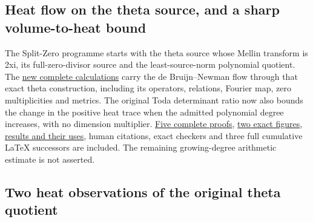 \documentclass[
]{article}
\begin{document}
\subsection{Heat flow on the theta source, and a sharp volume-to-heat
bound}\label{heat-flow-on-the-theta-source-and-a-sharp-volume-to-heat-bound}

The Split-Zero programme starts with the theta source whose Mellin
transform is 2xi, its full-zero-divisor source and the least-source-norm
polynomial quotient. The
\href{https://github.com/KokunoYumeto/zeta-function-research-reader/blob/main/workbenches/splitzero-tandem/continuations/20260920-heat-transport-arithmetic-volume/README.md}{new
complete calculations} carry the de Bruijn--Newman flow through that
exact theta construction, including its operators, relations, Fourier
map, zero multiplicities and metrics. The original Toda determinant
ratio now also bounds the change in the positive heat trace when the
admitted polynomial degree increases, with no dimension multiplier.
\href{https://github.com/KokunoYumeto/zeta-function-research-reader/blob/main/workbenches/splitzero-tandem/continuations/20260920-heat-transport-arithmetic-volume/COMPLETE_PROOFS.tex}{Five
complete proofs},
\href{https://github.com/KokunoYumeto/zeta-function-research-reader/blob/main/workbenches/splitzero-tandem/continuations/20260920-heat-transport-arithmetic-volume/FIGURE_CAPTION.md}{two
exact figures},
\href{https://github.com/KokunoYumeto/zeta-function-research-reader/blob/main/workbenches/splitzero-tandem/continuations/20260920-heat-transport-arithmetic-volume/RESULT_INDEX.json}{results
and their uses}, human citations, exact checkers and three full
cumulative LaTeX successors are included. The remaining growing-degree
arithmetic estimate is not asserted.

\subsection{Two heat observations of the original theta
quotient}\label{two-heat-observations-of-the-original-theta-quotient}
\end{document}
